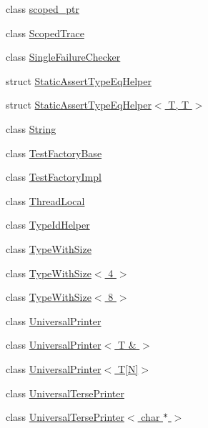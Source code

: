 \begin{DoxyCompactItemize}
\item 
class \hyperlink{classtesting_1_1internal_1_1scoped__ptr}{scoped\+\_\+ptr}
\item 
class \hyperlink{classtesting_1_1internal_1_1_scoped_trace}{Scoped\+Trace}
\item 
class \hyperlink{classtesting_1_1internal_1_1_single_failure_checker}{Single\+Failure\+Checker}
\item 
struct \hyperlink{structtesting_1_1internal_1_1_static_assert_type_eq_helper}{Static\+Assert\+Type\+Eq\+Helper}
\item 
struct \hyperlink{structtesting_1_1internal_1_1_static_assert_type_eq_helper_3_01_t_00_01_t_01_4}{Static\+Assert\+Type\+Eq\+Helper$<$ T, T $>$}
\item 
class \hyperlink{classtesting_1_1internal_1_1_string}{String}
\item 
class \hyperlink{classtesting_1_1internal_1_1_test_factory_base}{Test\+Factory\+Base}
\item 
class \hyperlink{classtesting_1_1internal_1_1_test_factory_impl}{Test\+Factory\+Impl}
\item 
class \hyperlink{classtesting_1_1internal_1_1_thread_local}{Thread\+Local}
\item 
class \hyperlink{classtesting_1_1internal_1_1_type_id_helper}{Type\+Id\+Helper}
\item 
class \hyperlink{classtesting_1_1internal_1_1_type_with_size}{Type\+With\+Size}
\item 
class \hyperlink{classtesting_1_1internal_1_1_type_with_size_3_014_01_4}{Type\+With\+Size$<$ 4 $>$}
\item 
class \hyperlink{classtesting_1_1internal_1_1_type_with_size_3_018_01_4}{Type\+With\+Size$<$ 8 $>$}
\item 
class \hyperlink{singletontesting_1_1internal_1_1_universal_printer}{Universal\+Printer}
\item 
class \hyperlink{classtesting_1_1internal_1_1_universal_printer_3_01_t_01_6_01_4}{Universal\+Printer$<$ T \& $>$}
\item 
class \hyperlink{classtesting_1_1internal_1_1_universal_printer_3_01_t[_n]_4}{Universal\+Printer$<$ T\mbox{[}\+N\mbox{]}$>$}
\item 
class \hyperlink{classtesting_1_1internal_1_1_universal_terse_printer}{Universal\+Terse\+Printer}
\item 
class \hyperlink{classtesting_1_1internal_1_1_universal_terse_printer_3_01char_01_5_01_4}{Universal\+Terse\+Printer$<$ char $\ast$ $>$}
\item 

\end{DoxyCompactItemize}
